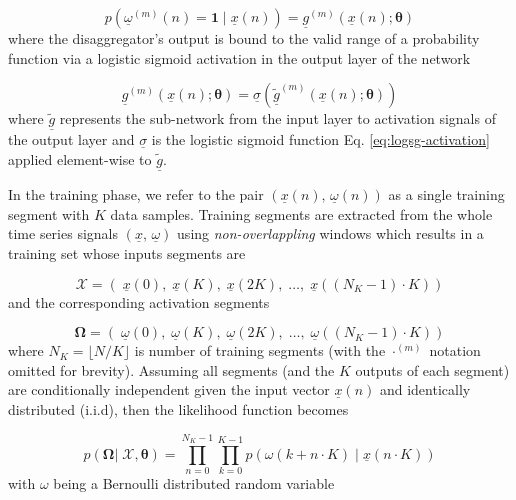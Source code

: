\documentclass[twocolumn,letter,10pt]{IEEEtran} %
\begin{document}
{\small\begin{equation}
	p\left(\underline{\omega}^{(m)}(n)=\bm{1}\;\big|\;\underline{x}(n)\right) = \underline{g}^{(m)}\left(\underline{x}(n); \bm{\theta}\right)
	\end{equation}}%
where the disaggregator's output is bound to the valid range of a probability function via a logistic sigmoid activation in the output layer of the network

{\small\begin{equation}
	\underline{g}^{(m)}\left(\underline{x}(n); \bm{\theta}\right) = \underline{\sigma}\left(\underline{\tilde{g}}^{(m)}\left(\underline{x}(n); \bm{\theta}\right)\right)
	\end{equation}}%
where $\underline{\tilde{g}}$ represents the sub-network from the input layer to activation signals of the output layer and $\underline{\sigma}$ is the logistic sigmoid function Eq. \ref{eq:logsg-activation} applied element-wise to $\underline{\tilde{g}}$.

In the training phase, we refer to the pair $\left(\underline{x}(n),\,\underline{\omega}(n)\right)$ as a single training segment with $K$ data samples. Training segments are extracted from the whole time series signals $\left(\underline{x},\,\underline{\omega}\right)$ using \emph{non-overlappling} windows which results in a training set whose inputs segments are

{\small\begin{equation}
	\bm{\mathcal{X}} =\left(\; \underline{x}(0),\; \underline{x}(K),\; \underline{x}(2K),\; \dots,\;\underline{x}((N_K-1)\cdot K)\right)
	\label{eq:condition-prob}
	\end{equation}}%
and the corresponding activation segments

{\small\begin{equation}
	\bm{\Omega} = \left(\; \underline{\omega}(0),\; \underline{\omega}(K),\; \underline{\omega}(2K),\; \dots,\; \underline{\omega}((N_K-1)\cdot K)\right)
	\end{equation}}%
where $N_K = \lfloor N / K\rfloor$ is number of training segments (with the $\cdot^{(m)}$ notation omitted for brevity). Assuming all segments (and the $K$ outputs of each segment) are conditionally independent given the input vector $\underline{x}(n)$ and identically distributed (i.i.d), then the likelihood function becomes


{\small\begin{equation*}
	p\left(\bm{\Omega} |\; \bm{\mathcal{X}}, \bm{\theta} \right) = \prod_{n=0}^{N_K-1} \prod_{k=0}^{K-1} p\left(\omega(k + n\cdot K) \;|\; \underline{x}(n\cdot K)\right)
	\end{equation*}}%
with $\omega$ being a Bernoulli distributed random variable
\end{document}
